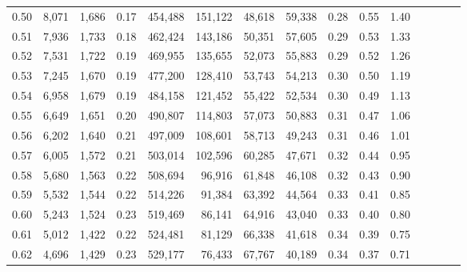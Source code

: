 \begin{tabular}{rrrcrrrrrrrrrrr}
0.50 &   8,071 &  1,686 &                                       0.17 &  454,488 &  151,122 &   48,618 &   59,338 &  0.28 &  0.55 &                         1.40 \\
0.51 &   7,936 &  1,733 &                                       0.18 &  462,424 &  143,186 &   50,351 &   57,605 &  0.29 &  0.53 &                         1.33 \\
0.52 &   7,531 &  1,722 &                                       0.19 &  469,955 &  135,655 &   52,073 &   55,883 &  0.29 &  0.52 &                         1.26 \\
0.53 &   7,245 &  1,670 &                                       0.19 &  477,200 &  128,410 &   53,743 &   54,213 &  0.30 &  0.50 &                         1.19 \\
0.54 &   6,958 &  1,679 &                                       0.19 &  484,158 &  121,452 &   55,422 &   52,534 &  0.30 &  0.49 &                         1.13 \\
0.55 &   6,649 &  1,651 &                                       0.20 &  490,807 &  114,803 &   57,073 &   50,883 &  0.31 &  0.47 &                         1.06 \\
0.56 &   6,202 &  1,640 &                                       0.21 &  497,009 &  108,601 &   58,713 &   49,243 &  0.31 &  0.46 &                         1.01 \\
0.57 &   6,005 &  1,572 &                                       0.21 &  503,014 &  102,596 &   60,285 &   47,671 &  0.32 &  0.44 &                         0.95 \\
0.58 &   5,680 &  1,563 &                                       0.22 &  508,694 &   96,916 &   61,848 &   46,108 &  0.32 &  0.43 &                         0.90 \\
0.59 &   5,532 &  1,544 &                                       0.22 &  514,226 &   91,384 &   63,392 &   44,564 &  0.33 &  0.41 &                         0.85 \\
0.60 &   5,243 &  1,524 &                                       0.23 &  519,469 &   86,141 &   64,916 &   43,040 &  0.33 &  0.40 &                         0.80 \\
0.61 &   5,012 &  1,422 &                                       0.22 &  524,481 &   81,129 &   66,338 &   41,618 &  0.34 &  0.39 &                         0.75 \\
0.62 &   4,696 &  1,429 &                                       0.23 &  529,177 &   76,433 &   67,767 &   40,189 &  0.34 &  0.37 &                         0.71 \\

\end{tabular}
